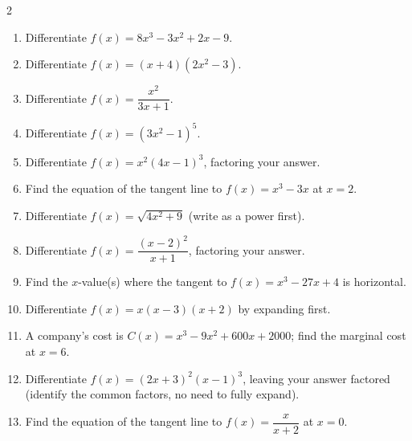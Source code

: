 \documentclass[11pt]{article}
\begin{document}
\begin{recapbox}
\begin{multicols}{2}
\small
\begin{enumerate}[leftmargin=*,itemsep=3pt]
  \item Differentiate $f(x)=8x^3-3x^2+2x-9$.
  \item Differentiate $f(x)=(x+4)(2x^2-3)$.
  \item Differentiate $f(x)=\dfrac{x^2}{3x+1}$.
  \item Differentiate $f(x)=(3x^2-1)^5$.
  \item Differentiate $f(x)=x^2(4x-1)^3$, factoring your answer.
  \item Find the equation of the tangent line to $f(x)=x^3-3x$ at $x=2$.
  \item Differentiate $f(x)=\sqrt{4x^2+9}$ (write as a power first).
  \item Differentiate $f(x)=\dfrac{(x-2)^2}{x+1}$, factoring your answer.
  \item Find the $x$-value(s) where the tangent to $f(x)=x^3-27x+4$ is horizontal.
  \item Differentiate $f(x)=x(x-3)(x+2)$ by expanding first.
  \item A company's cost is $C(x)=x^3-9x^2+600x+2000$; find the marginal cost at $x=6$.
  \item Differentiate $f(x)=(2x+3)^2(x-1)^3$, leaving your answer factored (identify the common factors, no need to fully expand).
  \item Find the equation of the tangent line to $f(x)=\dfrac{x}{x+2}$ at $x=0$.
\end{enumerate}
\end{multicols}
\end{recapbox}
\end{document}
